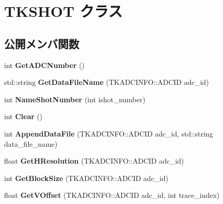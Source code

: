 \hypertarget{class_t_k_s_h_o_t}{}\section{T\+K\+S\+H\+OT クラス}
\label{class_t_k_s_h_o_t}
\subsection*{公開メンバ関数}
\begin{DoxyCompactItemize}
\item 
\mbox{\label{class_t_k_s_h_o_t_af116d5e195d9853c78d3e4ddb00e2c57}} 
int {\bfseries Get\+A\+D\+C\+Number} ()
\item 
\mbox{\label{class_t_k_s_h_o_t_ac102eb99258f9950569960d73f9ce946}} 
std\+::string {\bfseries Get\+Data\+File\+Name} (T\+K\+A\+D\+C\+I\+N\+F\+O\+::\+A\+D\+C\+ID adc\+\_\+id)
\item 
\mbox{\label{class_t_k_s_h_o_t_a8f91dff3640a574152c6fb3c5e542f62}} 
int {\bfseries Name\+Shot\+Number} (int ishot\+\_\+number)
\item 
\mbox{\label{class_t_k_s_h_o_t_a8edc2c710c0dd04d619ddb5f105c41fe}} 
int {\bfseries Clear} ()
\item 
\mbox{\label{class_t_k_s_h_o_t_a6337475c0a3915a1c9ecdea289c30258}} 
int {\bfseries Append\+Data\+File} (T\+K\+A\+D\+C\+I\+N\+F\+O\+::\+A\+D\+C\+ID adc\+\_\+id, std\+::string data\+\_\+file\+\_\+name)
\item 
\mbox{\label{class_t_k_s_h_o_t_a1d6b251b7f6606df57fcd727ea062433}} 
float {\bfseries Get\+H\+Resolution} (T\+K\+A\+D\+C\+I\+N\+F\+O\+::\+A\+D\+C\+ID adc\+\_\+id)
\item 
\mbox{\label{class_t_k_s_h_o_t_a5edbf2e53db13a8577fea4d8e9c7757b}} 
int {\bfseries Get\+Block\+Size} (T\+K\+A\+D\+C\+I\+N\+F\+O\+::\+A\+D\+C\+ID adc\+\_\+id)
\item 
\mbox{\label{class_t_k_s_h_o_t_a94ad848c94a6328f12fa77af5be167f9}} 
float {\bfseries Get\+V\+Offset} (T\+K\+A\+D\+C\+I\+N\+F\+O\+::\+A\+D\+C\+ID adc\+\_\+id, int trace\+\_\+index)

\end{DoxyCompactItemize}
